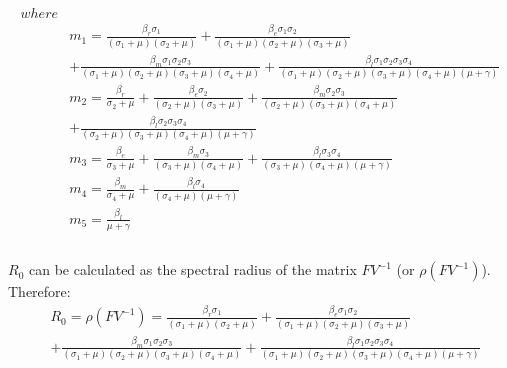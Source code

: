 \begin{align*}
where \\
&m_1 = \frac{\beta_r \sigma_{1}}{{\left(\sigma_{1} + \mu\right)} {\left(\sigma_{2} + \mu\right)}} + \frac{\beta_e \sigma_{1} \sigma_{2}}{{\left(\sigma_{1} + \mu\right)} {\left(\sigma_{2} + \mu\right)} {\left(\sigma_{3} + \mu\right)}} \\ 
&+ \frac{\beta_m \sigma_{1} \sigma_{2} \sigma_{3}}{{\left(\sigma_{1} + \mu\right)} {\left(\sigma_{2} + \mu\right)} {\left(\sigma_{3} + \mu\right)} {\left(\sigma_{4} + \mu\right)}} + \frac{\beta_l \sigma_{1} \sigma_{2} \sigma_{3} \sigma_{4}}{{\left(\sigma_{1} + \mu\right)} {\left(\sigma_{2} + \mu\right)} {\left(\sigma_{3} + \mu\right)} {\left(\sigma_{4} + \mu\right)} {\left(\mu + \gamma\right)}} \\
&m_2= \frac{\beta_r}{\sigma_{2} + \mu} + \frac{\beta_e \sigma_{2}}{{\left(\sigma_{2} + \mu\right)} {\left(\sigma_{3} + \mu\right)}} + \frac{\beta_m \sigma_{2} \sigma_{3}}{{\left(\sigma_{2} + \mu\right)} {\left(\sigma_{3} + \mu\right)} {\left(\sigma_{4} + \mu\right)}} \\ & + \frac{\beta_l \sigma_{2} \sigma_{3} \sigma_{4}}{{\left(\sigma_{2} + \mu\right)} {\left(\sigma_{3} + \mu\right)} {\left(\sigma_{4} + \mu\right)} {\left(\mu + \gamma\right)}} \\
&m_3= \frac{\beta_e}{\sigma_{3} + \mu} + \frac{\beta_m \sigma_{3}}{{\left(\sigma_{3} + \mu\right)} {\left(\sigma_{4} + \mu\right)}} + \frac{\beta_l \sigma_{3} \sigma_{4}}{{\left(\sigma_{3} + \mu\right)} {\left(\sigma_{4} + \mu\right)} {\left(\mu + \gamma\right)}} \\
&m_4= \frac{\beta_m}{\sigma_{4} + \mu} + \frac{\beta_l \sigma_{4}}{{\left(\sigma_{4} + \mu\right)} {\left(\mu + \gamma\right)}} \\
&m_5= \frac{\beta_l}{\mu + \gamma} \\
\end{align*}\\
$R_0$ can be calculated as the spectral radius of the matrix $FV^{-1}$ (or $\rho(FV^{-1})$). Therefore:
\begin{align*}
&R_0 = \rho(FV^{-1}) = \frac{\beta_r \sigma_{1}}{{\left(\sigma_{1} + \mu\right)} {\left(\sigma_{2} + \mu\right)}} + \frac{\beta_e \sigma_{1} \sigma_{2}}{{\left(\sigma_{1} + \mu\right)} {\left(\sigma_{2} + \mu\right)} {\left(\sigma_{3} + \mu\right)}} \\ 
&+ \frac{\beta_m \sigma_{1} \sigma_{2} \sigma_{3}}{{\left(\sigma_{1} + \mu\right)} {\left(\sigma_{2} + \mu\right)} {\left(\sigma_{3} + \mu\right)} {\left(\sigma_{4} + \mu\right)}} + \frac{\beta_l \sigma_{1} \sigma_{2} \sigma_{3} \sigma_{4}}{{\left(\sigma_{1} + \mu\right)} {\left(\sigma_{2} + \mu\right)} {\left(\sigma_{3} + \mu\right)} {\left(\sigma_{4} + \mu\right)} {\left(\mu + \gamma\right)}}
\end{align*}